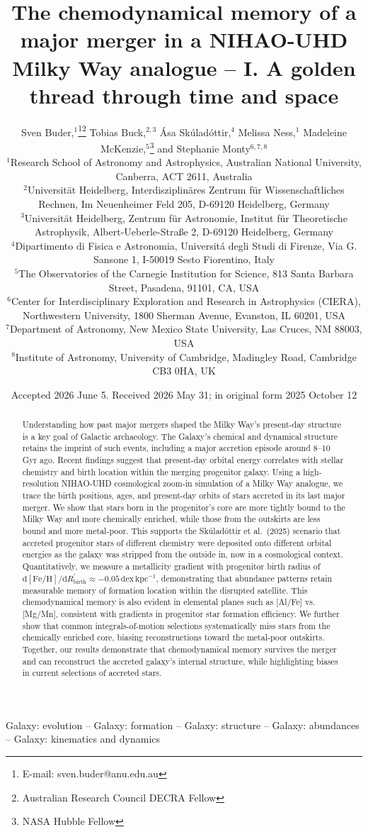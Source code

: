 \documentclass[fleqn,usenatbib]{mnras}
\title[A golden thread through time and space]{The chemodynamical memory of a major merger in a NIHAO-UHD Milky Way analogue -- I. A golden thread through time and space}
\author[S. Buder et al.]{Sven Buder,$^{1}$\thanks{E-mail: sven.buder@anu.edu.au}\thanks{Australian Research Council DECRA Fellow}\orcidlink{0000-0002-4031-8553}
Tobias Buck,$^{2,3}$\orcidlink{0000-0003-2027-399X}
Ása Skúladóttir,$^{4}$\orcidlink{0000-0001-9155-9018}
Melissa Ness,$^{1}$\orcidlink{0000-0001-5082-6693}
Madeleine McKenzie,$^{5}$\thanks{NASA Hubble Fellow}\orcidlink{0000-0002-1715-1257}
and\newauthor
Stephanie Monty$^{6, 7, 8}$\orcidlink{0000-0002-9225-5822}
\\
$^{1}$Research School of Astronomy and Astrophysics, Australian National University, Canberra, ACT 2611, Australia\\
$^{2}$Universit{\"a}t Heidelberg, Interdisziplin{\"a}res Zentrum f{\"u}r Wissenschaftliches Rechnen, Im Neuenheimer Feld 205, D-69120 Heidelberg, Germany\\
$^{3}$Universit{\"a}t Heidelberg, Zentrum f{\"u}r Astronomie, Institut f{\"u}r Theoretische Astrophysik, Albert-Ueberle-Straße 2, D-69120 Heidelberg, Germany\\
$^{4}$Dipartimento di Fisica e Astronomia, Universitá degli Studi di Firenze, Via G. Sansone 1, I-50019 Sesto Fiorentino, Italy\\
$^{5}$The Observatories of the Carnegie Institution for Science, 813 Santa Barbara Street, Pasadena, 91101, CA, USA\\
$^{6}$Center for Interdisciplinary Exploration and Research in Astrophysics (CIERA), Northwestern University, 1800 Sherman Avenue,
Evanston, IL 60201, USA\\
$^{7}$Department of Astronomy, New Mexico State University, Las Cruces, NM 88003, USA\\
$^{8}$Institute of Astronomy, University of Cambridge, Madingley Road, Cambridge CB3 0HA, UK}
\date{Accepted 2026 June 5. Received 2026 May 31; in original form 2025 October 12}
\newcommand{\changes}[1]{#1}
\begin{document}
\label{firstpage}
\pagerange{\pageref{firstpage}--\pageref{lastpage}}
\maketitle

\begin{abstract} %
Understanding how past major mergers shaped the Milky Way's present-day structure is a key goal of Galactic archaeology. The Galaxy's chemical and dynamical structure retains the imprint of such events, including a major accretion episode around 8--10 Gyr ago. Recent findings suggest that present-day orbital energy correlates with stellar chemistry and birth location within the merging progenitor galaxy. Using a high-resolution NIHAO-UHD cosmological zoom-in simulation of a Milky Way analogue, we trace the birth positions, ages, and present-day orbits of stars accreted in its last major merger. We show that stars born in the progenitor's core are more tightly bound to the Milky Way and more chemically enriched, while those from the outskirts are less bound and more metal-poor. This supports the Sk\'ulad\'ottir et al.\ (2025) scenario \changes{that accreted progenitor stars of different chemistry were deposited onto different orbital energies as the galaxy was stripped from the outside in}, now in a cosmological context. Quantitatively, we measure a metallicity gradient with progenitor birth radius of $\mathrm{d[Fe/H]}/\mathrm{d}R_\mathrm{birth}^\prime \approx -0.05\,\mathrm{dex\,kpc^{-1}}$, demonstrating that abundance patterns retain measurable memory of formation location within the disrupted satellite. This chemodynamical memory is also evident in elemental planes such as [Al/Fe] vs. [Mg/Mn], consistent with gradients in progenitor star formation efficiency. We further show that common integrals-of-motion selections systematically miss stars from the chemically enriched core, biasing reconstructions toward the metal-poor outskirts. Together, our results demonstrate that chemodynamical memory survives the merger and can reconstruct the accreted galaxy's internal structure, while highlighting biases in current selections of accreted stars.
\end{abstract}

\begin{keywords}Galaxy: evolution -- Galaxy: formation -- Galaxy: structure -- Galaxy: abundances -- Galaxy: kinematics and dynamics\end{keywords}
\end{document}
